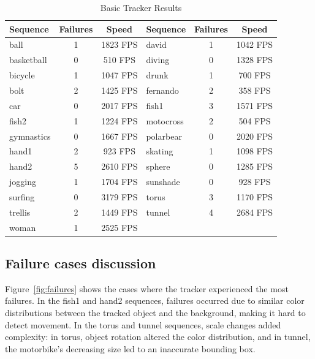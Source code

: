 \documentclass[9pt]{IEEEtran}
\begin{document}
\begin{table}[h]
  \centering
  \caption{Basic Tracker Results}
  \setlength{\tabcolsep}{3pt}
  \begin{tabular}{l|c|c||l|c|c}
  \hline
  \textbf{Sequence} & \textbf{Failures} & \textbf{Speed} & \textbf{Sequence} & \textbf{Failures} & \textbf{Speed} \\ 
  \hline
  ball       & 1 & 1823 FPS & david     & 1 & 1042 FPS \\ 
  basketball & 0 & 510 FPS  & diving    & 0 & 1328 FPS \\ 
  bicycle    & 1 & 1047 FPS & drunk     & 1 & 700 FPS  \\ 
  bolt       & 2 & 1425 FPS & fernando  & 2 & 358 FPS  \\ 
  car        & 0 & 2017 FPS & fish1     & 3 & 1571 FPS \\ 
  fish2      & 1 & 1224 FPS & motocross & 2 & 504 FPS  \\ 
  gymnastics & 0 & 1667 FPS & polarbear & 0 & 2020 FPS \\ 
  hand1      & 2 & 923 FPS  & skating   & 1 & 1098 FPS \\ 
  hand2      & 5 & 2610 FPS & sphere    & 0 & 1285 FPS \\ 
  jogging    & 1 & 1704 FPS & sunshade  & 0 & 928 FPS  \\ 
  surfing    & 0 & 3179 FPS & torus     & 3 & 1170 FPS \\ 
  trellis    & 2 & 1449 FPS & tunnel    & 4 & 2684 FPS \\ 
  woman      & 1 & 2525 FPS &           &   &          \\ 
  \hline
  \end{tabular}
  \label{tab:basic_tracker_results}
  \end{table}
  
  
  \subsection{Failure cases discussion}
  Figure~\ref{fig:failures} shows the cases where the tracker experienced the most failures.
   In the fish1 and hand2 sequences, failures occurred due to similar color distributions 
   between the tracked object and the background, making it hard to detect movement.
    In the torus and tunnel sequences, scale changes added complexity: in torus, object 
    rotation altered the color distribution, and in tunnel, the motorbike’s decreasing size 
    led to an inaccurate bounding box.
\end{document}
